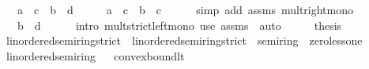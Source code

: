 \begin{isabellebody}
\ \ \ {\isachardoublequoteopen}a\ {\isacharasterisk}{\kern0pt}\ c\ {\isacharless}{\kern0pt}\ b\ {\isacharasterisk}{\kern0pt}\ d{\isachardoublequoteclose}\isanewline
%
\isadelimproof
%
\endisadelimproof
%
\isatagproof
{}\isamarkupfalse%
\ {\isacharminus}{\kern0pt}\isanewline
\ \ \isamarkupfalse%
\ {\isachardoublequoteopen}a\ {\isacharasterisk}{\kern0pt}\ c\ {\isasymle}\ b\ {\isacharasterisk}{\kern0pt}\ c{\isachardoublequoteclose}\isanewline
\ \ \ \ \isamarkupfalse%
\ {\isacharparenleft}{\kern0pt}simp\ add{\isacharcolon}{\kern0pt}\ assms\ mult{\isacharunderscore}{\kern0pt}right{\isacharunderscore}{\kern0pt}mono{\isacharparenright}{\kern0pt}\isanewline
\ \ \isamarkupfalse%
\ \isamarkupfalse%
\ {\isachardoublequoteopen}{\isachardot}{\kern0pt}{\isachardot}{\kern0pt}{\isachardot}{\kern0pt}\ {\isacharless}{\kern0pt}\ b\ {\isacharasterisk}{\kern0pt}\ d{\isachardoublequoteclose}\isanewline
\ \ \ \ \isamarkupfalse%
\ {\isacharparenleft}{\kern0pt}intro\ mult{\isacharunderscore}{\kern0pt}strict{\isacharunderscore}{\kern0pt}left{\isacharunderscore}{\kern0pt}mono{\isacharparenright}{\kern0pt}\ {\isacharparenleft}{\kern0pt}use\ assms\ \ auto{\isacharparenright}{\kern0pt}\isanewline
\ \ \isamarkupfalse%
\ \isamarkupfalse%
\ {\isacharquery}{\kern0pt}thesis\ \isacommand{{\isachardot}{\kern0pt}}\isamarkupfalse%
\isanewline
{}\isamarkupfalse%
%
\endisatagproof
{\isafoldproof}%
%
\isadelimproof
\isanewline
%
\endisadelimproof
\isanewline
{}\isamarkupfalse%
\isanewline
\isanewline
{}\isamarkupfalse%
\ linordered{\isacharunderscore}{\kern0pt}semiring{\isacharunderscore}{\kern0pt}{}{\isacharunderscore}{\kern0pt}strict\ {\isacharequal}{\kern0pt}\ linordered{\isacharunderscore}{\kern0pt}semiring{\isacharunderscore}{\kern0pt}strict\ {\isacharplus}{\kern0pt}\ semiring{\isacharunderscore}{\kern0pt}{}\ {\isacharplus}{\kern0pt}\ zero{\isacharunderscore}{\kern0pt}less{\isacharunderscore}{\kern0pt}one\isanewline
{}\isanewline
\isanewline
{}\isamarkupfalse%
\ linordered{\isacharunderscore}{\kern0pt}semiring{\isacharunderscore}{\kern0pt}{}%
\isadelimproof
\ %
\endisadelimproof
%
\isatagproof
\isacommand{{\isachardot}{\kern0pt}{\isachardot}{\kern0pt}}\isamarkupfalse%
%
\endisatagproof
{\isafoldproof}%
%
\isadelimproof
%
\endisadelimproof
\isanewline
\isanewline
{}\isamarkupfalse%
\ convex{\isacharunderscore}{\kern0pt}bound{\isacharunderscore}{\kern0pt}lt{\isacharcolon}{\kern0pt}\isanewline

\end{isabellebody}
